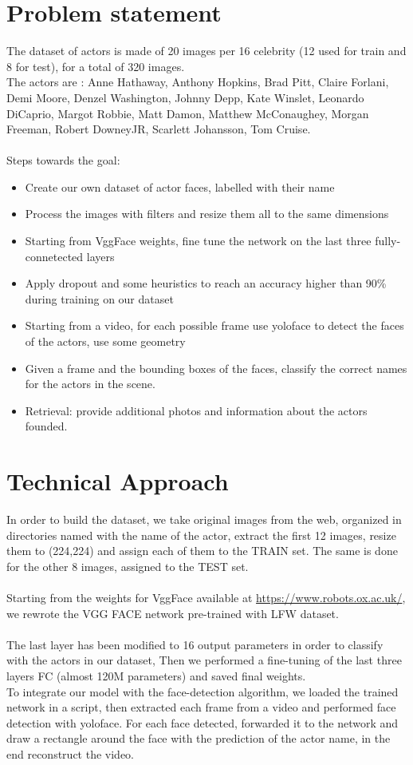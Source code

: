 \documentclass{article}
\begin{document}
\section{Problem statement}
The dataset of actors is made of 20 images per 16 celebrity (12 used for train and 8 for test), for a total of 320 images.
\\The actors are : 
Anne Hathaway,
Anthony Hopkins,
Brad Pitt,
Claire Forlani,
Demi Moore,
Denzel Washington,
Johnny Depp,
Kate Winslet,
Leonardo DiCaprio,
Margot Robbie,
Matt Damon,
Matthew McConaughey,
Morgan Freeman,
Robert DowneyJR,
Scarlett Johansson,
Tom Cruise.\\\\
Steps towards the goal:
\begin{itemize}
  \item Create our own dataset of actor faces, labelled with their name
  \item Process the images with filters and resize them all to the same dimensions
  \item Starting from VggFace weights, fine tune the network on the last three fully-connetected layers
  \item Apply dropout and some heuristics to reach an accuracy higher than 90\% during training on our dataset
  \item Starting from a video, for each possible frame use yoloface to detect the faces of the actors, use some geometry
  \item Given a frame and the bounding boxes of the faces, classify the correct names for the actors in the scene.
  \item Retrieval: provide additional photos and information about the actors founded.
\end{itemize}

\section{Technical Approach}
In order to build the dataset, we take original images from the web, organized in directories named with the name of the actor,
extract the first 12 images, resize them to (224,224) and assign each of them to the TRAIN set.
The same is done for the other 8 images, assigned to the TEST set.
\\\\
Starting from the weights for VggFace available at \url{https://www.robots.ox.ac.uk/}, 
we rewrote the VGG FACE network pre-trained with LFW dataset.
\\\\
The last layer has been modified to 16 output parameters in order to classify with the actors in our dataset,
Then we performed a fine-tuning of the last three layers FC (almost 120M parameters) and saved final weights.
\\
To integrate our model with the face-detection algorithm, we loaded the trained network in a script, then extracted each frame from a video
and performed face detection with yoloface.
For each face detected, forwarded it to the network and draw a rectangle around the face with the prediction of the actor name,
in the end reconstruct the video.
\\ 
\end{document}
